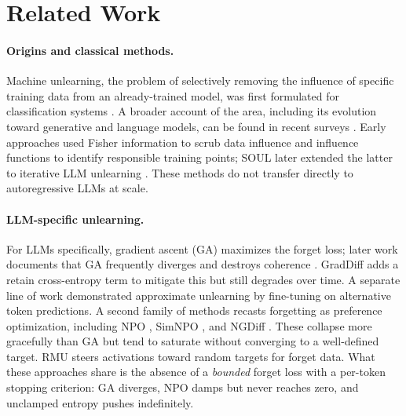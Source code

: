 \section{Related Work}
\label{sec:related_work}

\paragraph{Origins and classical methods.}
Machine unlearning, the problem of selectively removing the influence of specific training data from an already-trained model, was first formulated for classification systems \citep{cao2015towards, bourtoule2021machine}.
A broader account of the area, including its evolution toward generative and language models, can be found in recent surveys \citep{liu2024survey, blanco2025digital}.
Early approaches used Fisher information to scrub data influence \citep{golatkar2020eternal, golatkar2020forgetting} and influence functions \citep{koh2017understanding} to identify responsible training points; SOUL later extended the latter to iterative LLM unlearning \citep{jia2024soul}.
These methods do not transfer directly to autoregressive LLMs at scale.

\paragraph{LLM-specific unlearning.}
For LLMs specifically, gradient ascent (GA) \citep{jang2023knowledge} maximizes the forget loss; later work documents that GA frequently diverges and destroys coherence \citep{zhang2024negative}.
GradDiff \citep{yao2024large} adds a retain cross-entropy term to mitigate this but still degrades over time.
A separate line of work \citep{eldan2023whos} demonstrated approximate unlearning by fine-tuning on alternative token predictions.
A second family of methods recasts forgetting as preference optimization, including NPO \citep{zhang2024negative}, SimNPO \citep{fan2025simplicity}, and NGDiff \citep{bu2025unlearning}.
These collapse more gracefully than GA but tend to saturate without converging to a well-defined target.
RMU \citep{li2024wmdp} steers activations toward random targets for forget data.
What these approaches share is the absence of a \emph{bounded} forget loss with a per-token stopping criterion: GA diverges, NPO damps but never reaches zero, and unclamped entropy \citep{yuan2025closer} pushes indefinitely.

